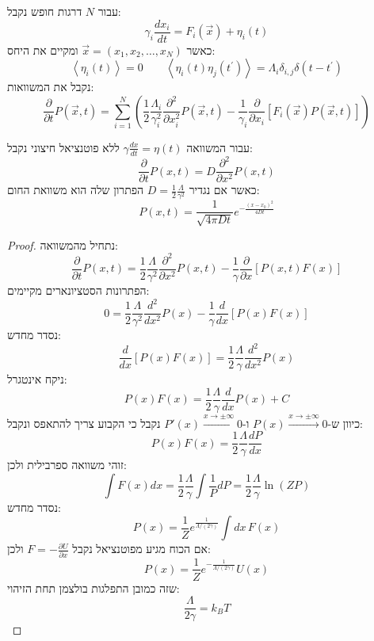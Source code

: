 \documentclass{tstextbook}
\begin{document}
עבור \(N\) דרגות חופש נקבל:
$$\gamma_{i}\frac{d x_{i}}{d t}=F_{i}\left(\vec{x}\right)+\eta_{i}\left(t\right)$$
כאשר \(\vec{x}=\left( x_{1},x_{2},\dots,x_{N} \right)\) ומקיים את היחס:
$$\left\langle\eta_{i}\left(t\right)\right\rangle=0\qquad\left\langle\eta_{i}\left(t\right)\eta_{j}\left(t^{\prime}\right)\right\rangle=\Lambda_{i}\delta_{i,j}\delta\left(t-t^{\prime}\right)$$
נקבל את המשוואות:
$$\frac{\partial}{\partial t}P\left(\vec{x},t\right)=\sum_{i=1}^{N}\left(\frac{1}{2}\frac{\Lambda_{i}}{\gamma_{i}^{2}}\frac{\partial^{2}}{\partial x_{i}^{2}}P\left(\vec{x},t\right)-\frac{1}{\gamma_{i}}\frac{\partial}{\partial x_{i}}\left[F_{i}\left(\vec{x}\right)P\left(\vec{x},t\right)\right]\right)$$

\begin{example}
עבור המשוואה \(\gamma{\frac{d x}{d t}}=\eta\left(t\right)\) ללא פוטנציאל חיצוני נקבל:
$${\frac{\partial}{\partial t}}P\left(x,t\right)=D{\frac{\partial^{2}}{\partial x^{2}}}P\left(x,t\right)$$
כאשר אם נגדיר \(D=\frac{1}{2}\frac{\Lambda}{\gamma^{2}}\) הפתרון שלה הוא משוואת החום:
$$P\left(x,t\right)={\frac{1}{\sqrt{4\pi D t}}}e^{-{\frac{(x-x_{0})^{2}}{4D t}}}$$

\end{example}
\begin{proposition}
\end{proposition}
\begin{proof}
נתחיל מהמשוואה:
$$\frac{\partial}{\partial t}P\left(x,t\right)=\frac{1}{2}\frac{\Lambda}{\gamma^{2}}\frac{\partial^{2}}{\partial x^{2}}P\left(x,t\right)-\frac{1}{\gamma}\frac{\partial}{\partial x}\left[P\left(x,t\right)F\left(x\right)\right]$$
הפתרונות הסטציונארים מקיימים:
$$0=\frac12\frac{\Lambda}{\gamma^{2}}\frac{d^{2}}{d x^{2}}P\left(x\right)-\frac1{\gamma}\frac d{d x}\left[P\left(x\right)F\left(x\right)\right]$$
נסדר מחדש:
$${\frac{d}{d x}}\left[P\left(x\right)F\left(x\right)\right]={\frac{1}{2}}{\frac{\Lambda}{\gamma}}{\frac{d^{2}}{d x^{2}}}P\left(x\right)$$
ניקח אינטגרל:
$$P\left(x\right)F\left(x\right)=\frac{1}{2}\frac{\Lambda}{\gamma}\frac{d}{d x}P\left(x\right)+C$$
כיוון ש-\(P(x)\xrightarrow{x\to \pm \infty}0\) ו-\(P'(x)\xrightarrow{x\to \pm \infty}0\) נקבל כי הקבוע צריך להתאפס ונקבל:
$$P\left(x\right)F\left(x\right)=\frac{1}{2}\frac{\Lambda}{\gamma}\frac{d P}{d x}$$
זוהי משוואה ספרבילית ולכן:
$$\int F\left(x\right)d x=\frac{1}{2}\frac{\Lambda}{\gamma}\int\frac{1}{P}d P=\frac{1}{2}\frac{\Lambda}{\gamma}\ln\left(Z P\right)$$
נסדר מחדש:
$$P\left(x\right)=\frac{1}{Z}e^{\frac{1}{\Lambda/\left(2\gamma\right)}}\int d x\,F(x)$$
אם הכוח מגיע מפוטנציאל נקבל \(F=-\frac{\partial U}{\partial x}\) ולכן:
$$P\left(x\right)=\frac{1}{Z}e^{-\frac{1}{\Lambda/\left(2\gamma\right)}}U(x)$$
שזה כמובן התפלגות בולצמן תחת הזיהוי:
$${\frac{\Lambda}{2\gamma}}=k_{B}T$$

\end{proof}
\end{document}
